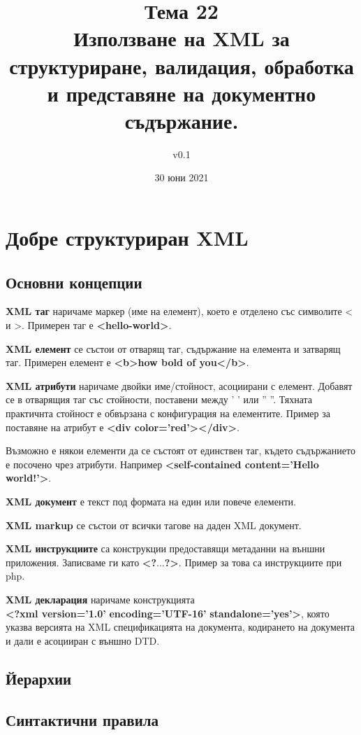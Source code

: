 \documentclass[fleqn,12pt]{article}
\title{Тема 22 \\Използване на XML за структуриране, валидация, обработка и представяне на документно съдържание.}
\author{v0.1}
\date{30 юни 2021}
\begin{document}
\maketitle
\tableofcontents
\pagebreak

\section{Добре структуриран XML}

\subsection{Основни концепции}

\textbf{XML таг} наричаме маркер (име на елемент), което е отделено със символите < и >. Примерен таг е \textbf{<hello-world>}.
\bigbreak

\textbf{XML елемент} се състои от отварящ таг, съдържание на елемента и затварящ таг. Примерен елемент е \textbf{<b>how bold of you</b>}.
\bigbreak

\textbf{XML атрибути} наричаме двойки име/стойност, асоциирани с елемент.
Добавят се в отварящия таг със стойности, поставени между ' ' или '' ''.
Тяхната практичнта стойност е обвързана с конфигурация на елементите.
Пример за поставяне на атрибут е \textbf{<div color='red'></div>}.
\bigbreak

Възможно е някои елементи да се състоят от единствен таг, където съдържанието е посочено чрез атрибути. Например \textbf{<self-contained content='Hello world!'>}.
\bigbreak

\textbf{XML документ} е текст под формата на един или повече елементи.
\bigbreak

\textbf{XML markup} се състои от всички тагове на даден XML документ.
\bigbreak

\textbf{XML инструкциите} са конструкции предоставящи метаданни на външни приложения. Записваме ги като \textbf{<?$\dots$?>}. Пример за това са инструкциите при php.
\bigbreak

\textbf{XML декларация} наричаме конструкцията \\\textbf{<?xml version='1.0'} \textbf{encoding='UTF-16'} \textbf{standalone='yes'>}, която указва версията на XML спецификацията на документа, кодирането на документа и дали е асоцииран с външно DTD.


\subsection{Йерархии}
\subsection{Синтактични правила}
\end{document}
